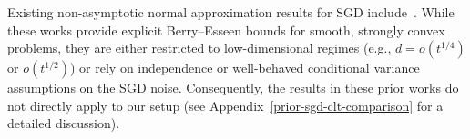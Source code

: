 \documentclass[11pt, reqno,english]{amsart}
\begin{document}




Existing non-asymptotic normal approximation results for SGD include~\cite{anastasiou2019normal,shao2022berry,durmus2022finite, durmus2021tight, samsonov2024gaussian, Khusainov2025GaussianApprox, WuLiWeiRinaldo2025InferenceTD, Samsonov2025StatisticalInferenceLSA}. While these works provide explicit Berry--Esseen bounds for smooth, strongly convex problems, they are either restricted to low-dimensional regimes (e.g., $d = o(t^{1/4})$ or $o(t^{1/2})$) or rely on independence or well-behaved conditional variance assumptions on the SGD noise. Consequently, the results in these prior works do not directly apply to our setup (see Appendix~\ref{prior-sgd-clt-comparison} for a detailed discussion).
\end{document}
